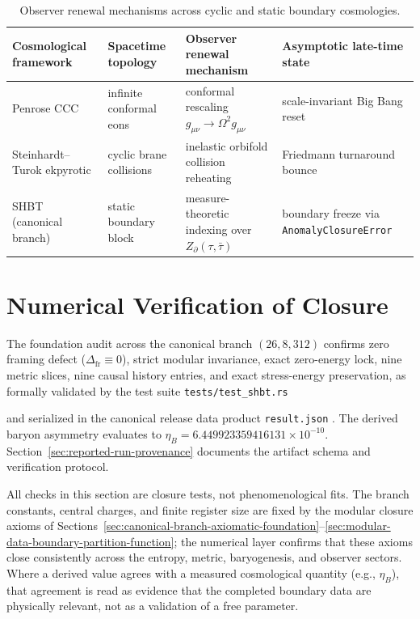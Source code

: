 \documentclass[11pt,letterpaper]{article}
\theoremstyle{plain}
\DeclareRobustCommand{\pyvar}[1]{%
  \ifmmode\text{\nolinkurl{#1}}\else\nolinkurl{#1}\fi%
}
\newcommand{\Zboundary}{Z_{\partial}}
\begin{document}
\begin{table}[htbp]
\centering
\small
\begin{tabularx}{\linewidth}{@{}lYYl@{}}
\toprule
Cosmological framework & Spacetime topology & Observer renewal mechanism & Asymptotic late-time state \\
\midrule
Penrose CCC & infinite conformal eons & conformal rescaling $g_{\mu\nu}\to\Omega^2g_{\mu\nu}$ & scale-invariant Big Bang reset \\
Steinhardt--Turok ekpyrotic & cyclic brane collisions & inelastic orbifold collision reheating & Friedmann turnaround bounce \\
SHBT (canonical branch) & static boundary block & measure-theoretic indexing over $\Zboundary(\tau,\bar\tau)$ & boundary freeze via \texttt{AnomalyClosureError} \\
\bottomrule
\end{tabularx}
\caption{Observer renewal mechanisms across cyclic and static boundary
cosmologies.}
\label{tab:heat-death-comparison}
\end{table}


\section{Numerical Verification of Closure}
\label{sec:numerical-verification-performance}

The foundation audit across the canonical branch \((26,8,312)\) confirms zero
framing defect ($\Delta_{\text{fr}} \equiv 0$), strict modular invariance, exact
zero-energy lock, nine metric slices, nine causal history entries, and exact
stress-energy preservation, as formally validated by the test suite \pyvar{tests/test_shbt.rs}
and serialized in the canonical release data product \pyvar{result.json}.
The derived baryon asymmetry evaluates to \(\eta_B = 6.449923359416131\times10^{-10}\).
Section~\ref{sec:reported-run-provenance} documents the artifact schema and verification protocol.

All checks in this section are closure tests, not phenomenological fits.
The branch constants, central charges, and finite register size are fixed by
the modular closure axioms of Sections~\ref{sec:canonical-branch-axiomatic-foundation}--\ref{sec:modular-data-boundary-partition-function};
the numerical layer confirms that these axioms close consistently across the
entropy, metric, baryogenesis, and observer sectors.  Where a derived value
agrees with a measured cosmological quantity (e.g., \(\eta_B\)), that agreement
is read as evidence that the completed boundary data are physically relevant,
not as a validation of a free parameter.
\end{document}

